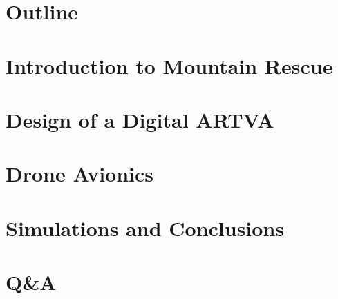 \documentclass{beamer}
\begin{document}
\section*{Outline}


\section{Introduction to Mountain Rescue}
	\frame{\centering \tableofcontents[currentsection]}
	
	
\section{Design of a Digital ARTVA}
	\frame{\centering \tableofcontents[currentsection]}
	
	
	
	

\section{Drone Avionics}
	\frame{\centering \tableofcontents[currentsection]}
	
		
	
	
	
	
\section{Simulations and Conclusions}	
	\frame{\centering \tableofcontents[currentsection]}
	
	
	

\section*{Q\&A}
	
	
	

	
	

	

	
	
\end{document}
